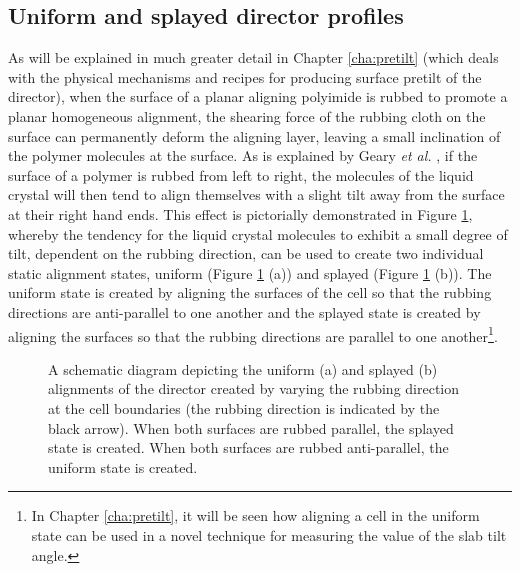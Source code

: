 \subsection{Uniform and splayed director profiles}
As will be explained in much greater detail in Chapter \ref{cha:pretilt} (which deals with the physical mechanisms and recipes for producing surface pretilt of the director), when the surface of a planar aligning polyimide is rubbed to promote a planar homogeneous alignment, the shearing force of the rubbing cloth on the surface can permanently deform the aligning layer, leaving a small inclination of the polymer molecules at the surface. As is explained by Geary \textit{et al.} \cite{Geary1987}, if the surface of a polymer is rubbed from left to right, the molecules of the liquid crystal will then tend to align themselves with a slight tilt away from the surface at their right hand ends. This effect is pictorially demonstrated in Figure \ref{fig:uniform_splayed}, whereby the tendency for the liquid crystal molecules to exhibit a small degree of tilt, dependent on the rubbing direction, can be used to create two individual static alignment states, uniform (Figure \ref{fig:uniform_splayed} (a)) and splayed (Figure \ref{fig:uniform_splayed} (b)). The uniform state is created by aligning the surfaces of the cell so that the rubbing directions are anti-parallel to one another and the splayed state is created by aligning the surfaces so that the rubbing directions are parallel to one another\footnote{In Chapter \ref{cha:pretilt}, it will be seen how aligning a cell in the uniform state can be used in a novel technique for measuring the value of the slab tilt angle.}.

\begin{figure}
\begin{center}
\hspace{0.1in}
\end{center}
\caption[Schematic diagram of the splayed and uniform states]{\label{fig:uniform_splayed} A schematic diagram depicting the uniform (a) and splayed (b) alignments of the director created by varying the rubbing direction at the cell boundaries (the rubbing direction is indicated by the black arrow). When both surfaces are rubbed parallel, the splayed state is created. When both surfaces are rubbed anti-parallel, the uniform state is created.}
\end{figure}

